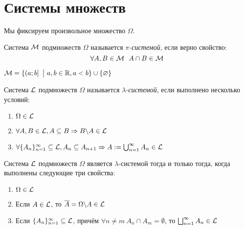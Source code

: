 \section{Системы множеств}

\begin{note}
	Мы фиксируем произвольное множество $\Omega$.
\end{note}

\begin{definition}
	Система $\mathcal{M}$ подмножеств $\Omega$ называется \textit{$\pi$-системой}, если верно свойство:
	\[
		\forall A, B \in \cM\ \ A \cap B \in \cM
	\]
\end{definition}

\begin{example}
	$\mathcal{M} = \{\left(a; b\right] \ \big|\  a, b \in \mathbb{R}, a < b\} \cup \{\varnothing\}$
\end{example}

\begin{definition}
	Система $\mathcal{L}$ подмножеств $\Omega$ называется \textit{$\lambda$-системой}, если выполнено несколько условий:
	\begin{enumerate}
		\item $\Omega \in \mathcal{L}$
		
		\item $\forall A, B \in \mathcal{L}, A \subseteq B \Rightarrow B \backslash A \in \mathcal{L}$
		
		\item $\forall \{A_n\}_{n = 1}^\infty \subseteq \mathcal{L}, A_n \subseteq A_{n + 1} \Rightarrow A := \bigcup_{n = 1}^\infty A_n \in \mathcal{L}$
	\end{enumerate}
\end{definition}

\begin{proposition}
	Система $\mathcal{L}$ подмножеств $\Omega$ является $\lambda$-системой тогда и только тогда, когда выполнены следующие три свойства:
	\begin{enumerate}
		\item $\Omega \in \mathcal{L}$
		
		\item Если $A \in \mathcal{L}$, то $\overline{A} = \Omega \backslash A \in \mathcal{L}$
		
		\item Если $\{A_n\}_{n = 1}^\infty \subseteq \mathcal{L}$, причём $\forall n \neq m\ A_n \cap A_m = \emptyset$, то $\bigsqcup_{n = 1}^\infty A_n \in \mathcal{L}$
	\end{enumerate}
\end{proposition}

